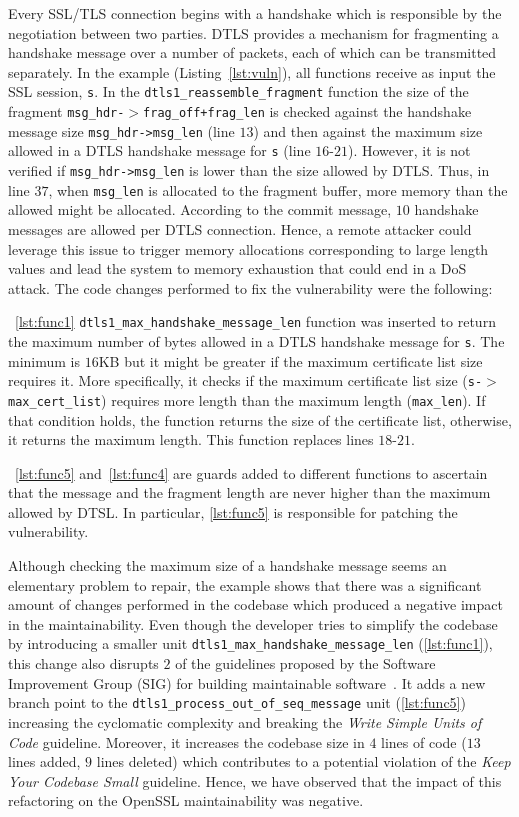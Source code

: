 \documentclass[10pt,conference]{IEEEtran}
\begin{document}
Every SSL/TLS connection begins with a handshake which is responsible by the
negotiation between two parties. DTLS provides a mechanism for fragmenting a
handshake message over a number of packets, each of which can be transmitted
separately. In the example (Listing~\ref{lst:vuln}), all functions receive as
input the SSL session, \texttt{s}. In the \texttt{dtls1\_reassemble\_fragment}
function the size of the fragment \texttt{msg\_hdr-$>$frag\_off+frag\_len} is
checked against the handshake message size \texttt{msg\_hdr->msg\_len} (line
$13$) and then against the maximum size allowed in a DTLS handshake message for
\texttt{s} (line $16$-$21$). However, it is not verified if \texttt{msg\_hdr->msg\_len}
is lower than the size allowed by DTLS. Thus, in line
$37$, when \texttt{msg\_len} is allocated to the fragment buffer, more memory
than the allowed might be allocated. According to the commit message, $10$
handshake messages are allowed per DTLS connection. Hence, a remote attacker
could leverage this issue to trigger memory allocations corresponding to large
length values and lead the system to memory exhaustion that could end in a DoS
attack. The code changes performed to fix the vulnerability were the following:

~\ref{lst:func1} \texttt{dtls1\_max\_handshake\_message\_len} function was
inserted to return the maximum number of bytes allowed in a DTLS
handshake message for \texttt{s}. The minimum is $16$KB but it might be greater if
the maximum certificate list size requires it. More
specifically, it checks if the maximum certificate list size
(\texttt{s-$>$max\_cert\_list}) requires more length than the maximum length
(\texttt{max\_len}). If that condition holds, the function returns the size of
the certificate list, otherwise, it returns the maximum length. This function
replaces lines $18$-$21$.

~\ref{lst:func5} and~\ref{lst:func4} are guards added to different functions to
ascertain that the message and the fragment length are never higher than the
maximum allowed by DTSL. In particular, \ref{lst:func5} is responsible for patching
the vulnerability.

Although checking the maximum size of a handshake message seems an elementary
problem to repair, the example shows that there was a significant amount of
changes performed in the codebase which produced a negative impact in the
maintainability. Even though the developer tries to simplify the
codebase by introducing a smaller unit
\texttt{dtls1\_max\_handshake\_message\_len} (\ref{lst:func1}), this change also
disrupts $2$ of the guidelines proposed by the Software Improvement Group (SIG) for
building maintainable software~\cite{Visser:2016:OREILLY}. It adds a new branch
point to the \texttt{dtls1\_process\_out\_of\_seq\_message} unit
(\ref{lst:func5}) increasing the cyclomatic complexity and breaking the
\emph{Write Simple Units of Code} guideline. Moreover, it increases the codebase
size in $4$ lines of code ($13$ lines added, $9$ lines deleted) which
contributes to a potential violation of the \emph{Keep Your Codebase Small}
guideline. Hence, we have observed that the impact of this refactoring on the
OpenSSL maintainability was negative.
\end{document}
